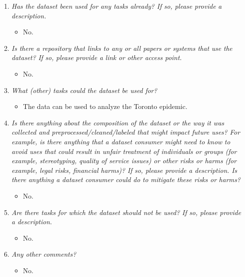 \documentclass[
]{article}
\providecommand{\tightlist}{%
  \setlength{\itemsep}{0pt}\setlength{\parskip}{0pt}}
\begin{document}
\begin{enumerate}
\def\labelenumi{\arabic{enumi}.}
\tightlist
\item
  \emph{Has the dataset been used for any tasks already? If so, please provide a description.}

  \begin{itemize}
  \tightlist
  \item
    No.
  \end{itemize}
\item
  \emph{Is there a repository that links to any or all papers or systems that use the dataset? If so, please provide a link or other access point.}

  \begin{itemize}
  \tightlist
  \item
    No.
  \end{itemize}
\item
  \emph{What (other) tasks could the dataset be used for?}

  \begin{itemize}
  \tightlist
  \item
    The data can be used to analyze the Toronto epidemic.
  \end{itemize}
\item
  \emph{Is there anything about the composition of the dataset or the way it was collected and preprocessed/cleaned/labeled that might impact future uses? For example, is there anything that a dataset consumer might need to know to avoid uses that could result in unfair treatment of individuals or groups (for example, stereotyping, quality of service issues) or other risks or harms (for example, legal risks, financial harms)? If so, please provide a description. Is there anything a dataset consumer could do to mitigate these risks or harms?}

  \begin{itemize}
  \tightlist
  \item
    No.
  \end{itemize}
\item
  \emph{Are there tasks for which the dataset should not be used? If so, please provide a description.}

  \begin{itemize}
  \tightlist
  \item
    No.
  \end{itemize}
\item
  \emph{Any other comments?}

  \begin{itemize}
  \tightlist
  \item
    No.
  \end{itemize}
\end{enumerate}
\end{document}
